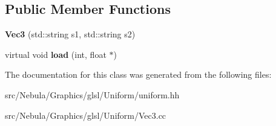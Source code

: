 \subsection*{\-Public \-Member \-Functions}
\begin{DoxyCompactItemize}
\item 
\hypertarget{classNeb_1_1glsl_1_1Uniform_1_1Vector_1_1Vec3_a1248082071bae8dbd4d346185c9b7185}{{\bfseries \-Vec3} (std\-::string s1, std\-::string s2)}\label{classNeb_1_1glsl_1_1Uniform_1_1Vector_1_1Vec3_a1248082071bae8dbd4d346185c9b7185}

\item 
\hypertarget{classNeb_1_1glsl_1_1Uniform_1_1Vector_1_1Vec3_ab6a541de14853990529d634b0971c28a}{virtual void {\bfseries load} (int, float $\ast$)}\label{classNeb_1_1glsl_1_1Uniform_1_1Vector_1_1Vec3_ab6a541de14853990529d634b0971c28a}

\end{DoxyCompactItemize}


\-The documentation for this class was generated from the following files\-:\begin{DoxyCompactItemize}
\item 
src/\-Nebula/\-Graphics/glsl/\-Uniform/uniform.\-hh\item 
src/\-Nebula/\-Graphics/glsl/\-Uniform/\-Vec3.\-cc\end{DoxyCompactItemize}
